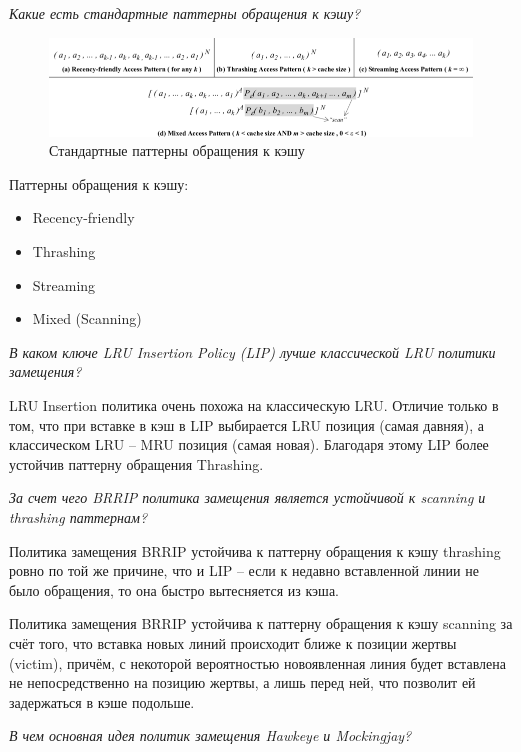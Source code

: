 	\textit{Какие есть стандартные паттерны обращения к кэшу?}
	
	\begin{figure}[h!]
		\centering
		\includegraphics[width=\linewidth]{pictures/access-patterns.png}
		\caption{Стандартные паттерны обращения к кэшу}
	\end{figure}
	
	Паттерны обращения к кэшу:
	\begin{itemize}
		\item Recency-friendly
		\item Thrashing
		\item Streaming
		\item Mixed (Scanning)
	\end{itemize}

	\textit{В каком ключе LRU Insertion Policy (LIP) лучше классической LRU политики замещения?}

	LRU Insertion политика очень похожа на классическую LRU. Отличие только в том, что при вставке в кэш в LIP выбирается LRU позиция (самая давняя), а классическом LRU -- MRU позиция (самая новая). Благодаря этому LIP более устойчив паттерну обращения Thrashing.
	
	\textit{За счет чего BRRIP политика замещения является устойчивой к scanning и thrashing паттернам?}
	
	Политика замещения BRRIP устойчива к паттерну обращения к кэшу thrashing ровно по той же причине, что и LIP -- если к недавно вставленной линии не было обращения, то она быстро вытесняется из кэша.
	
	Политика замещения BRRIP устойчива к паттерну обращения к кэшу scanning за счёт того, что вставка новых линий происходит ближе к позиции жертвы (victim), причём, с некоторой вероятностью новоявленная линия будет вставлена не непосредственно на позицию жертвы, а лишь перед ней, что позволит ей задержаться в кэше подольше.
	
	\textit{В чем основная идея политик замещения Hawkeye и Mockingjay?}
	
